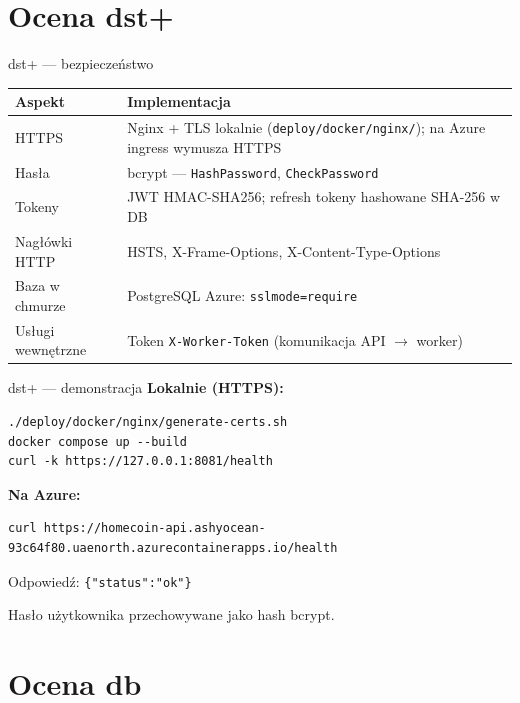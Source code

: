 \documentclass[aspectratio=169,11pt]{beamer}
\begin{document}
\section{Ocena dst+}

\begin{frame}{dst+ --- bezpieczeństwo}
  \small
  \begin{tabular}{@{}p{}p{}@{}}
    \toprule
    \textbf{Aspekt} & \textbf{Implementacja} \\
    \midrule
    HTTPS &
    Nginx + TLS lokalnie (\texttt{deploy/docker/nginx/}); na Azure ingress wymusza HTTPS \\
    \addlinespace
    Hasła &
    bcrypt --- \texttt{HashPassword}, \texttt{CheckPassword} \\
    \addlinespace
    Tokeny &
    JWT HMAC-SHA256; refresh tokeny hashowane SHA-256 w DB \\
    \addlinespace
    Nagłówki HTTP &
    HSTS, X-Frame-Options, X-Content-Type-Options \\
    \addlinespace
    Baza w chmurze &
    PostgreSQL Azure: \texttt{sslmode=require} \\
    \addlinespace
    Usługi wewnętrzne &
    Token \texttt{X-Worker-Token} (komunikacja API $\rightarrow$ worker) \\
    \bottomrule
  \end{tabular}
\end{frame}

\begin{frame}[fragile]{dst+ --- demonstracja}
  \textbf{Lokalnie (HTTPS):}
  \begin{lstlisting}
./deploy/docker/nginx/generate-certs.sh
docker compose up --build
curl -k https://127.0.0.1:8081/health
  \end{lstlisting}

  \textbf{Na Azure:}
  \begin{lstlisting}
curl https://homecoin-api.ashyocean-93c64f80.uaenorth.azurecontainerapps.io/health
  \end{lstlisting}

  Odpowiedź: \verb|{"status":"ok"}|

  \vspace{0.4em}
  Hasło użytkownika przechowywane jako hash bcrypt.
\end{frame}

\section{Ocena db}
\end{document}
